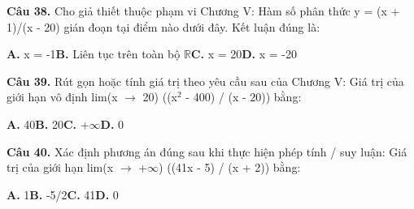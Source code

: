 \documentclass[11pt,a4paper]{article}
\begin{document}
\textbf{\color{primary} Câu 38.} Cho giả thiết thuộc phạm vi Chương V: Hàm số phân thức y = (x + 1)/(x - 20) gián đoạn tại điểm nào dưới đây. Kết luận đúng là:\par
\hspace*{1.5em}\textbf{A.} x = -1\quad\quad \textbf{B.} Liên tục trên toàn bộ $\mathbb{R}$\quad\quad \textbf{C.} x = 20\quad\quad \textbf{D.} x = -20\par\vspace{2pt}
\textbf{\color{primary} Câu 39.} Rút gọn hoặc tính giá trị theo yêu cầu sau của Chương V: Giá trị của giới hạn vô định lim(x $\to$ 20) ((x$^2$ - 400) / (x - 20)) bằng:\par
\hspace*{1.5em}\textbf{A.} 40\quad\quad \textbf{B.} 20\quad\quad \textbf{C.} +$\infty$\quad\quad \textbf{D.} 0\par\vspace{2pt}
\textbf{\color{primary} Câu 40.} Xác định phương án đúng sau khi thực hiện phép tính / suy luận: Giá trị của giới hạn lim(x $\to$ +$\infty$) ((41x - 5) / (x + 2)) bằng:\par
\hspace*{1.5em}\textbf{A.} 1\quad\quad \textbf{B.} -5/2\quad\quad \textbf{C.} 41\quad\quad \textbf{D.} 0\par\vspace{2pt}
\end{document}
